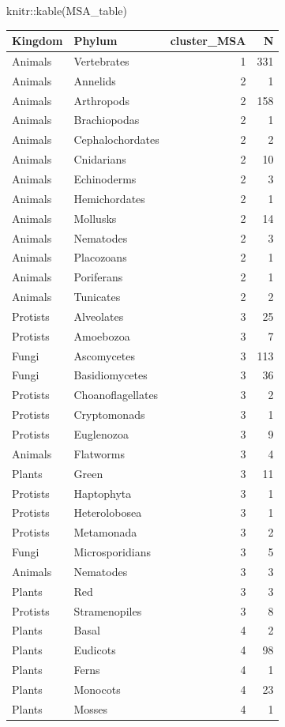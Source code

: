 \documentclass[
  letterpaper,
  DIV=11,
  numbers=noendperiod]{scrreprt}
\newenvironment{Shaded}{}{}
\newcommand{\FunctionTok}[1]{\textcolor[rgb]{0.38,0.69,0.94}{#1}}
\newcommand{\NormalTok}[1]{\textcolor[rgb]{0.67,0.70,0.75}{#1}}
\newcommand{\SpecialCharTok}[1]{\textcolor[rgb]{0.34,0.71,0.76}{#1}}
\begin{document}
\begin{Shaded}
\begin{Highlighting}[]
\NormalTok{knitr}\SpecialCharTok{::}\FunctionTok{kable}\NormalTok{(MSA\_table)}
\end{Highlighting}
\end{Shaded}

\begin{longtable}[]{@{}llrr@{}}
\toprule\noalign{}
Kingdom & Phylum & cluster\_MSA & N \\
\midrule\noalign{}
\endhead
\bottomrule\noalign{}
\endlastfoot
Animals & Vertebrates & 1 & 331 \\
Animals & Annelids & 2 & 1 \\
Animals & Arthropods & 2 & 158 \\
Animals & Brachiopodas & 2 & 1 \\
Animals & Cephalochordates & 2 & 2 \\
Animals & Cnidarians & 2 & 10 \\
Animals & Echinoderms & 2 & 3 \\
Animals & Hemichordates & 2 & 1 \\
Animals & Mollusks & 2 & 14 \\
Animals & Nematodes & 2 & 3 \\
Animals & Placozoans & 2 & 1 \\
Animals & Poriferans & 2 & 1 \\
Animals & Tunicates & 2 & 2 \\
Protists & Alveolates & 3 & 25 \\
Protists & Amoebozoa & 3 & 7 \\
Fungi & Ascomycetes & 3 & 113 \\
Fungi & Basidiomycetes & 3 & 36 \\
Protists & Choanoflagellates & 3 & 2 \\
Protists & Cryptomonads & 3 & 1 \\
Protists & Euglenozoa & 3 & 9 \\
Animals & Flatworms & 3 & 4 \\
Plants & Green & 3 & 11 \\
Protists & Haptophyta & 3 & 1 \\
Protists & Heterolobosea & 3 & 1 \\
Protists & Metamonada & 3 & 2 \\
Fungi & Microsporidians & 3 & 5 \\
Animals & Nematodes & 3 & 3 \\
Plants & Red & 3 & 3 \\
Protists & Stramenopiles & 3 & 8 \\
Plants & Basal & 4 & 2 \\
Plants & Eudicots & 4 & 98 \\
Plants & Ferns & 4 & 1 \\
Plants & Monocots & 4 & 23 \\
Plants & Mosses & 4 & 1 \\
\end{longtable}
\end{document}
